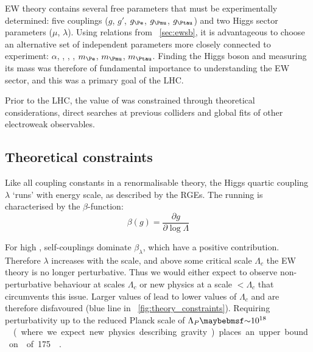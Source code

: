 
\ac{EW} theory contains several free parameters that must be experimentally 
determined: five couplings ($g$, $g'$, $g_{\Pe}$, $g_{\Pmu}$, $g_{\Ptau}$) and two 
Higgs sector parameters ($\mu$, $\lambda$). Using relations from \Section~\ref{sec:ewsb},
it is advantageous to choose an alternative set of independent parameters more closely
connected to experiment: $\alpha$, \mW, \mZ, \mH, $m_{\Pe}$, $m_{\Pmu}$, $m_{\Ptau}$.
Finding the Higgs boson and measuring its mass was therefore of fundamental importance to 
understanding the \ac{EW} sector, and this was a primary goal of the \ac{LHC}. 

Prior to the \ac{LHC}, the value of \mH was constrained through theoretical considerations,
direct searches at previous colliders and global fits of other electroweak observables.



\subsection{Theoretical constraints}
\label{sec:prior_constraints:theory}

Like all coupling constants in a renormalisable theory, the Higgs quartic coupling 
$\lambda$ `runs' with energy scale, as described by the \acp{RGE}. The running is
characterised by the $\beta$-function:
\begin{equation*}
	\beta (g) = \frac{\partial g}{\partial \log\Lambda}
\end{equation*}

For high \mH, self-couplings dominate $\beta_{\lambda}$, which have a
positive contribution. Therefore $\lambda$ increases with the scale, and above some 
critical scale $\Lambda_c$ the \ac{EW} theory is no longer perturbative. Thus we would 
either expect to observe non-perturbative behaviour at scales \about$\Lambda_c$ or new 
physics at a scale $<\Lambda_c$ that circumvents this issue. Larger values of \mH lead to 
lower values of $\Lambda_c$ and are therefore disfavoured (blue line in 
\Figure~\ref{fig:theory_constraints}). Requiring perturbativity up to the 
reduced Planck scale of \unit{$\Lambda_{P} \about 10^{18}$}{\GeV} (where we expect new 
physics describing gravity) places an upper bound on \mH of \unit{175}{\GeV} 
\cite{Ellis:2009}.


